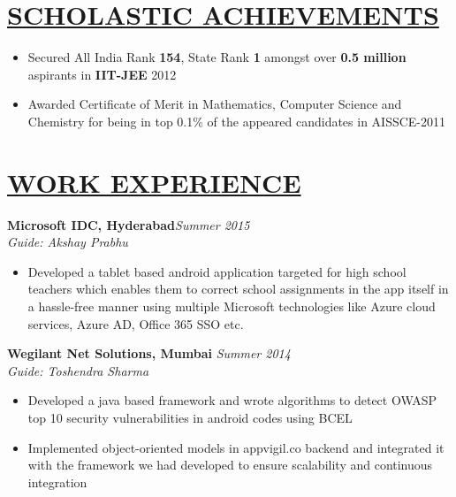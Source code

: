 \documentclass[11pt]{res}
\begin{document}
\thispagestyle{empty} %
\begin{resume}
\vspace{5ex}

\section{\underline{SCHOLASTIC ACHIEVEMENTS}}
\vspace{3pt}
\begin{itemize} \itemsep -2pt
\item Secured All India Rank \textbf{154}, State Rank \textbf{1} amongst over \textbf{0.5 million} aspirants in \textbf{IIT-JEE} 2012 
\item Awarded Certificate of Merit in Mathematics, Computer Science and Chemistry for being in top 0.1\% of the appeared candidates in AISSCE-2011
\end{itemize}

\vspace{-20pt}
\section{\underline{WORK EXPERIENCE}} 
\vspace{3pt}
\textbf{Microsoft IDC, Hyderabad}\hfill \emph{Summer 2015}\\
\textsl{Guide: Akshay Prabhu} \hfill  
\begin{itemize} \itemsep -2pt %
   \item Developed a tablet based android application targeted for high school teachers which enables them to correct school assignments in the app itself in a hassle-free manner using multiple Microsoft technologies like Azure cloud services, Azure AD, Office 365 SSO etc.
\end{itemize}

\vspace{-10pt}
\textbf{Wegilant Net Solutions, Mumbai} \hfill \emph{Summer 2014}\\
\textsl{Guide: Toshendra Sharma} \hfill  
 \begin{itemize} \itemsep -2pt
\item Developed a java based framework and wrote algorithms to detect OWASP top 10 security vulnerabilities in android codes using BCEL
\item Implemented object-oriented models in appvigil.co backend and integrated it with the framework we had developed to ensure scalability and continuous integration 
\end{itemize}


\end{resume}
\end{document}
